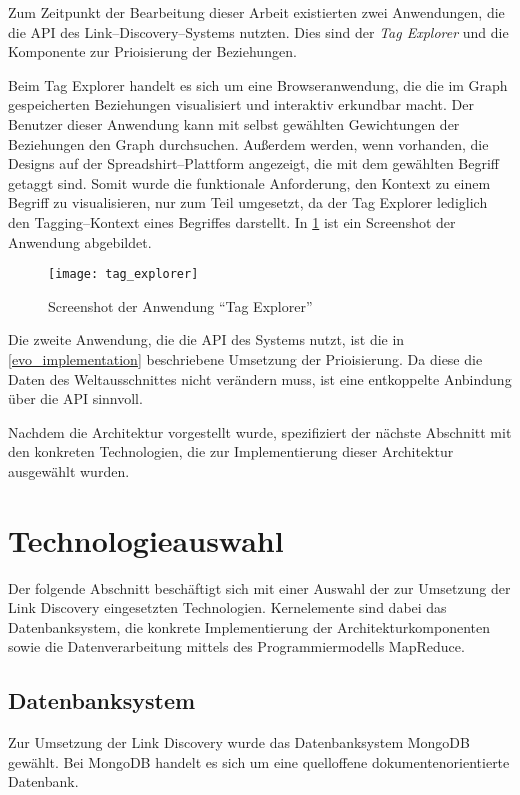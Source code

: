 Zum Zeitpunkt der Bearbeitung dieser Arbeit existierten zwei Anwendungen, die die API des Link--Discovery--Systems nutzten. Dies sind der \emph{Tag Explorer} und die Komponente zur Prioisierung der Beziehungen.

Beim Tag Explorer handelt es sich um eine Browseranwendung, die die im Graph gespeicherten Beziehungen visualisiert und interaktiv erkundbar macht. Der Benutzer dieser Anwendung kann mit selbst gewählten Gewichtungen der Beziehungen den Graph durchsuchen. Außerdem werden, wenn vorhanden, die Designs auf der Spreadshirt--Plattform angezeigt, die mit dem gewählten Begriff getaggt sind. Somit wurde die funktionale Anforderung, den Kontext zu einem Begriff zu visualisieren, nur zum Teil umgesetzt, da der Tag Explorer lediglich den Tagging--Kontext eines Begriffes darstellt. In \cref{fig:tag_explorer} ist ein Screenshot der Anwendung abgebildet.

\begin{figure}
\centering
\texttt{[image: tag\_explorer]}
\caption{Screenshot der Anwendung ``Tag Explorer''}
\label{fig:tag_explorer}
\end{figure}

Die zweite Anwendung, die die API des Systems nutzt, ist die in \cref{evo_implementation} beschriebene Umsetzung der Prioisierung. Da diese die Daten des Weltausschnittes nicht verändern muss, ist eine entkoppelte Anbindung über die API sinnvoll.

Nachdem die Architektur vorgestellt wurde, spezifiziert der nächste Abschnitt mit den konkreten Technologien, die zur Implementierung dieser Architektur ausgewählt wurden.

\section{Technologieauswahl}
\label{tech}

Der folgende Abschnitt beschäftigt sich mit einer Auswahl der zur Umsetzung der Link Discovery eingesetzten Technologien. Kernelemente sind dabei das Datenbanksystem, die konkrete Implementierung der Architekturkomponenten sowie die Datenverarbeitung mittels des Programmiermodells MapReduce.

\subsection{Datenbanksystem}
\label{db_choice}

Zur Umsetzung der Link Discovery wurde das Datenbanksystem MongoDB \cite{mo2013} gewählt. Bei MongoDB handelt es sich um eine quelloffene dokumentenorientierte Datenbank.


